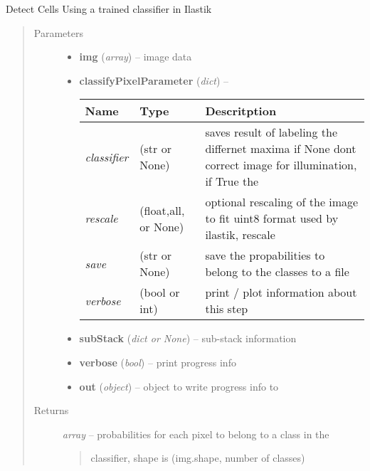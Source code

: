 \documentclass[letterpaper,10pt,english]{sphinxmanual}
\begin{document}
\begin{fulllineitems}
\label{api/ClearMap.ImageProcessing:ClearMap.ImageProcessing.IlastikClassification.classifyPixel}
Detect Cells Using a trained classifier in Ilastik
\begin{quote}\begin{description}
\item[{Parameters}] \leavevmode\begin{itemize}
\item {} 
\textbf{img} (\emph{array}) --
image data

\item {} 
\textbf{classifyPixelParameter} (\emph{dict}) --

\begin{tabulary}{\linewidth}{|L|L|L|}
\hline
\textsf{\relax 
Name
} & \textsf{\relax 
Type
} & \textsf{\relax 
Descritption
}\\
\hline
\emph{classifier}
 & 
(str or  None)
 & 
saves result of labeling the differnet maxima
if None dont correct image for illumination, if True the
\\
\hline
\emph{rescale}
 & 
(float,all, or None)
 & 
optional rescaling of the image to fit uint8 format
used by ilastik,  rescale
\\
\hline
\emph{save}
 & 
(str or None)
 & 
save the propabilities to belong to the classes to a file
\\
\hline
\emph{verbose}
 & 
(bool or int)
 & 
print / plot information about this step
\\
\hline\end{tabulary}


\item {} 
\textbf{subStack} (\emph{dict or None}) --
sub-stack information

\item {} 
\textbf{verbose} (\emph{bool}) --
print progress info

\item {} 
\textbf{out} (\emph{object}) --
object to write progress info to

\end{itemize}

\item[{Returns}] \leavevmode

\emph{array} --
probabilities for each pixel to belong to a class in the
\begin{quote}

classifier, shape is (img.shape, number of classes)
\end{quote}


\end{description}\end{quote}

\end{fulllineitems}
\end{document}
